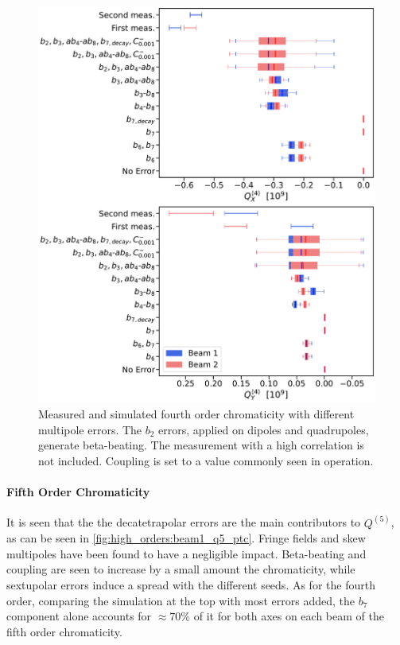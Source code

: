 \begin{figure}[H]
    \centering
    \includegraphics[width=0.8\columnwidth]{images/q4_ptc.pdf}
    \caption{Measured and simulated fourth order chromaticity with different multipole errors. The
    $b_2$ errors, applied on dipoles and quadrupoles, generate beta-beating. The measurement with a
    high correlation is not included. Coupling is set to a value commonly seen in operation.}
    \label{fig:high_orders:beam1_q4_ptc}
\end{figure}



\paragraph{Fifth Order Chromaticity}

It is seen that the the decatetrapolar errors are the main contributors to $Q^{(5)}$, as can be seen
in \cref{fig:high_orders:beam1_q5_ptc}. Fringe fields and skew multipoles have been found to have a
negligible impact. 
Beta-beating and coupling are seen to increase by a small amount the chromaticity, while sextupolar
errors induce a spread with the different seeds. 
As for the fourth order, comparing the simulation at the top with most errors added, the $b_7$
component alone accounts for $\approx 70\%$ of it for both axes on each beam of the fifth order
chromaticity.

